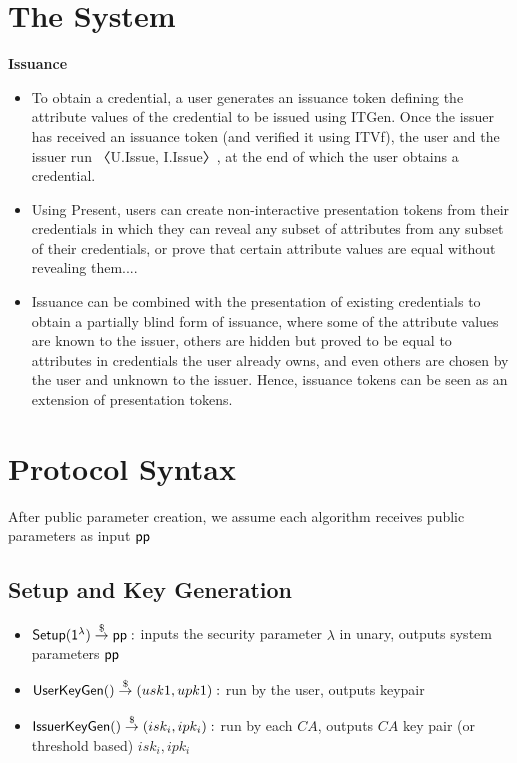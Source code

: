 \section{The System}
\textbf{Issuance}
\begin{itemize}
    \item To obtain a credential, a user generates an issuance token defining the attribute values of the credential to be issued using ITGen. Once the issuer has received an issuance token (and verified it using ITVf), the user and the issuer run 〈U.Issue, I.Issue〉, at the end of which the user obtains a credential.
    \item Using Present, users can create non-interactive presentation tokens from their credentials in which they can reveal any subset of attributes from any subset of their credentials, or prove that certain attribute values are equal without revealing them....
    \item Issuance can be combined with the presentation of existing credentials to obtain a partially blind form of issuance, where some of the attribute values are known to the issuer, others are hidden but proved to be equal to attributes in credentials the user already owns, and even others are chosen by the user and unknown to the issuer. Hence, issuance tokens can be seen as an extension of presentation tokens.
\end{itemize}



\section{Protocol Syntax}
After public parameter creation, we assume each algorithm receives public parameters as input $\mathsf{pp}$
\subsection{Setup and Key Generation}
\begin{itemize}
    \item $\mathsf{Setup}(\mathsf{1^{\lambda}}) \stackrel{\$}{\to} \mathsf{pp}:$ inputs the security parameter $\lambda$ in unary, outputs system parameters $\mathsf{pp}$

    \item $\mathsf{UserKeyGen}() \stackrel{\$}{\to} (usk1, upk1):$ run by the user, outputs keypair

    \item $\mathsf{IssuerKeyGen}() \stackrel{\$}{\to} (isk_i, ipk_i):$ run by each $CA$, outputs $CA$ key pair (or threshold based) $isk_i, ipk_i$
\end{itemize}


